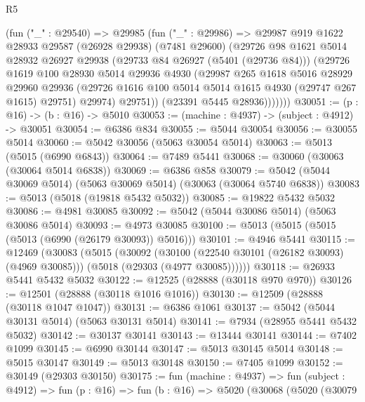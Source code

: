 \begin{lexlean}{R5}
\begin{coremodule}
            (fun ("_" : @29540) =>
            @29985
              (fun ("_" : @29986) =>
              @29987
                @919
                @1622
                @28933
                @29587
                (@26928 @29938)
                (@7481 @29600)
                (@29726
                  @98
                  @1621
                  @5014
                  @28932
                  @26927
                  @29938
                  (@29733 @84 @26927 (@5401 (@29736 @84)))
                  (@29726
                    @1619
                    @100
                    @28930
                    @5014
                    @29936
                    @4930
                    (@29987
                      @265
                      @1618
                      @5016
                      @28929
                      @29960
                      @29936
                      (@29726 @1616 @100 @5014 @5014 @1615 @4930 (@29747 @267 @1615) @29751)
                      @29974)
                    @29751))
                (@23391 @5445 @28936)))))))
@30051 := (p : @16) -> (b : @16) -> @5010
@30053 := (machine : @4937) -> (subject : @4912) -> @30051
@30054 := @6386 @834
@30055 := @5044 @30054
@30056 := @30055 @5014
@30060 := @5042 @30056 (@5063 @30054 @5014)
@30063 := @5013 (@5015 (@6990 @6843))
@30064 := @7489 @5441
@30068 := @30060 (@30063 (@30064 @5014 @6838))
@30069 := @6386 @858
@30079 := @5042 (@5044 @30069 @5014) (@5063 @30069 @5014) (@30063 (@30064 @5740 @6838))
@30083 := @5013 (@5018 (@19818 @5432 @5032))
@30085 := @19822 @5432 @5032
@30086 := @4981 @30085
@30092 := @5042 (@5044 @30086 @5014) (@5063 @30086 @5014)
@30093 := @4973 @30085
@30100 := @5013 (@5015 (@5015 (@5013 (@6990 (@26179 @30093)) @5016)))
@30101 := @4946 @5441
@30115 := @12469
    (@30083
      (@5015
        (@30092
          (@30100 (@22540 @30101 (@26182 @30093) (@4969 @30085)))
          (@5018 (@29303 (@4977 @30085))))))
@30118 := @26933 @5441 @5432 @5032
@30122 := @12525 (@28888 (@30118 @970 @970))
@30126 := @12501 (@28888 (@30118 @1016 @1016))
@30130 := @12509 (@28888 (@30118 @1047 @1047))
@30131 := @6386 @1061
@30137 := @5042 (@5044 @30131 @5014) (@5063 @30131 @5014)
@30141 := @7934 (@28955 @5441 @5432 @5032)
@30142 := @30137 @30141
@30143 := @13444 @30141
@30144 := @7402 @1099
@30145 := @6990 @30144
@30147 := @5013 @30145 @5014
@30148 := @5015 @30147
@30149 := @5013 @30148
@30150 := @7405 @1099
@30152 := @30149 (@29303 @30150)
@30175 := fun (machine : @4937) =>
  fun (subject : @4912) =>
  fun (p : @16) =>
  fun (b : @16) =>
  @5020
    (@30068
      (@5020
        (@30079

\end{coremodule}
\end{lexlean}
